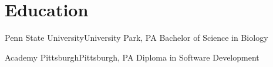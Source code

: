 
\section{Education}
\resumeSubHeadingListStart
  \resumeSubheading
    {Penn State University}{University Park, PA}
    {Bachelor of Science in Biology}{}

  \resumeSubheading
    {Academy Pittsburgh}{Pittsburgh, PA}
    {Diploma in Software Development}{}
\resumeSubHeadingListEnd